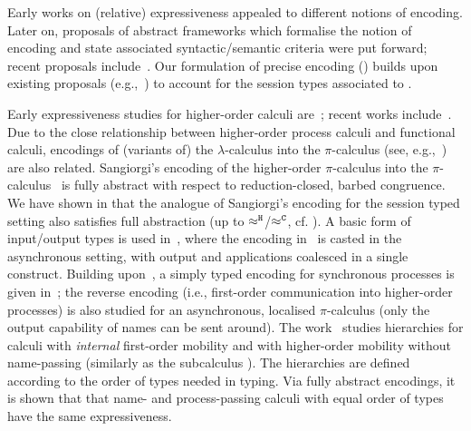 \documentclass[runningheads]{llncs}
\begin{document}
{{Early works on (relative) expressiveness appealed to different notions of encoding.
Later on, 
proposals of abstract 
frameworks which formalise the notion of encoding 
and state associated syntactic/semantic criteria 
were put forward; 
recent proposals include~\cite{DBLP:journals/iandc/Gorla10,DBLP:journals/tcs/FuL10,DBLP:journals/corr/abs-1208-2750,DBLP:conf/esop/PetersNG13,DBLP:journals/corr/PetersG15}. 
Our formulation of precise encoding () 
builds upon existing proposals (e.g.,~\cite{Palamidessi03,DBLP:journals/iandc/Gorla10,DBLP:conf/icalp/LanesePSS10})
 to account for the session types
associated to \HOp. %


Early expressiveness studies for higher-order calculi are~\cite{Tho90,SangiorgiD:expmpa}; 
recent works include~\cite{BundgaardHG06,DBLP:conf/icalp/LanesePSS10,DBLP:journals/iandc/LanesePSS11,XuActa2012,DBLP:conf/wsfm/XuYL13}.
Due to the close relationship between higher-order process calculi and functional calculi, 
encodings of (variants of) the $\lambda$-calculus into the $\pi$-calculus (see, e.g.,~\cite{San92,DBLP:journals/tcs/Fu99,DBLP:journals/iandc/YoshidaBH04,BHY,DBLP:conf/concur/SangiorgiX14}) are also related.
Sangiorgi's encoding of the higher-order $\pi$-calculus
into the  $\pi$-calculus~\cite{SangiorgiD:expmpa} 
is fully abstract with respect to reduction-closed, barbed congruence. 
We have shown in  that the analogue of Sangiorgi's encoding for the session typed setting also satisfies full abstraction (up to $\approx^\mathtt{H}$/$\approx^\mathtt{C}$, cf. ).
A basic form of input/output types is used in~\cite{DBLP:journals/tcs/Sangiorgi01}, where the encoding in~\cite{SangiorgiD:expmpa} is casted in the asynchronous setting, with output and applications coalesced in a single construct. Building upon~\cite{DBLP:journals/tcs/Sangiorgi01}, 
a simply typed encoding for synchronous processes is given in~\cite{SaWabook}; the reverse encoding (i.e.,  first-order communication into higher-order processes) is also studied  for an asynchronous, localised $\pi$-calculus (only the output capability of names can be sent around).
The work~\cite{San96int} studies hierarchies for calculi with \emph{internal} first-order mobility and 
with higher-order mobility without name-passing (similarly as the subcalculus \HO). 
The hierarchies are
defined according to the order of types needed in typing.
Via fully abstract encodings, it is shown that that name- and process-passing calculi with equal order of types have the same expressiveness.

}}
\end{document}
